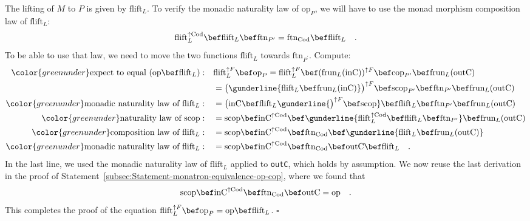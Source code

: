 The lifting of $M$ to $P$ is given by $\text{flift}_{L}$. To verify
the monadic naturality law of $\text{op}_{P}$, we will have to use
the monad morphism composition law of $\text{flift}_{L}$:
\[
\text{flift}_{L}^{\uparrow\text{Cod}}\bef\text{flift}_{L}\bef\text{ftn}_{P^{\prime}}=\text{ftn}_{\text{Cod}}\bef\text{flift}_{L}\quad.
\]
To be able to use that law, we need to move the two functions $\text{flift}_{L}$
towards $\text{ftn}_{P^{\prime}}$. Compute:
\begin{align*}
{\color{greenunder}\text{expect to equal }(\text{op}\bef\text{flift}_{L}):}\quad & \text{flift}_{L}^{\uparrow F}\bef\text{op}_{P}=\text{flift}_{L}^{\uparrow F}\bef(\text{frun}_{L}(\text{inC}))^{\uparrow F}\bef\text{cop}_{P^{\prime}}\bef\text{frun}_{L}(\text{outC})\\
 & =\big(\gunderline{\text{flift}_{L}\bef\text{frun}_{L}(\text{inC})}\big)^{\uparrow F}\bef\text{scop}_{P^{\prime}}\bef\text{ftn}_{P^{\prime}}\bef\text{frun}_{L}(\text{outC})\\
{\color{greenunder}\text{monadic naturality law of }\text{flift}_{L}:}\quad & =\big(\text{inC}\bef\text{flift}_{L}\gunderline{\big)^{\uparrow F}\bef\text{scop}}\bef\text{flift}_{L}\bef\text{ftn}_{P^{\prime}}\bef\text{frun}_{L}(\text{outC})\\
{\color{greenunder}\text{naturality law of }\text{scop}:}\quad & =\text{scop}\bef\text{inC}^{\uparrow\text{Cod}}\bef\gunderline{\text{flift}_{L}^{\uparrow\text{Cod}}\bef\text{flift}_{L}\bef\text{ftn}_{P^{\prime}}}\bef\text{frun}_{L}(\text{outC})\\
{\color{greenunder}\text{composition law of }\text{flift}_{L}:}\quad & =\text{scop}\bef\text{inC}^{\uparrow\text{Cod}}\bef\text{ftn}_{\text{Cod}}\bef\gunderline{\text{flift}_{L}\bef\text{frun}_{L}(\text{outC})}\\
{\color{greenunder}\text{monadic naturality law of }\text{flift}_{L}:}\quad & =\text{scop}\bef\text{inC}^{\uparrow\text{Cod}}\bef\text{ftn}_{\text{Cod}}\bef\text{outC}\bef\text{flift}_{L}\quad.
\end{align*}
In the last line, we used the monadic naturality law of $\text{flift}_{L}$
applied to \lstinline!outC!, which holds by assumption. We now reuse
the last derivation in the proof of Statement~\ref{subsec:Statement-monatron-equivalence-op-cop},
where we found that
\[
\text{scop}\bef\text{inC}^{\uparrow\text{Cod}}\bef\text{ftn}_{\text{Cod}}\bef\text{outC}=\text{op}\quad.
\]
This completes the proof of the equation $\text{flift}_{L}^{\uparrow F}\bef\text{op}_{P}=\text{op}\bef\text{flift}_{L}$.
$\square$

